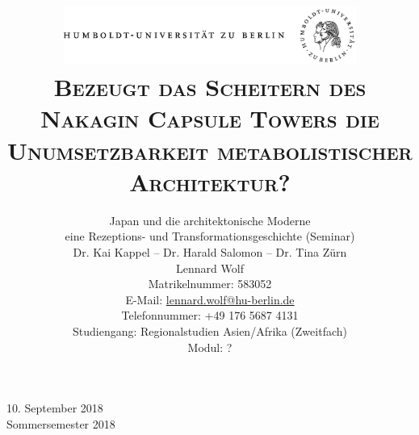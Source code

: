 \documentclass[a4paper, 12pt]{article}
\date{\vspace{-3ex}}
\begin{document}
\title{\vspace{5ex}
	\includegraphics*[bb=0 0 720 200, width=0.72\textwidth]{ErstesSem/images/hu_logo.png}\\
	\vspace{30pt}
	\scshape\LARGE{Bezeugt das Scheitern des Nakagin Capsule Towers die Unumsetzbarkeit metabolistischer Architektur?}\\\vspace{20pt}}
\author{Japan und die architektonische Moderne\\eine Rezeptions- und Transformationsgeschichte (Seminar)\\
	\vspace{7pt}
          Dr. Kai Kappel -- Dr. Harald Salomon -- Dr. Tina Zürn\\\vspace{4pt}Lennard Wolf\\
        \small{Matrikelnummer: 583052}\\
        \small{E-Mail: \href{mailto:lennard.wolf@hu-berlin.de}{lennard.wolf@hu-berlin.de}}\\
        \small{Telefonnummer: +49 176 5687 4131}\\
        \small{Studiengang: Regionalstudien Asien/Afrika (Zweitfach)}\\
        \small{Modul: ?}}

\maketitle

\vspace{\fill}

\begin{minipage}[]{0.92\textwidth}
    \centering
    \onehalfspacing
    \large   
    10. September 2018\\
    Sommersemester 2018

    \vspace{-20mm} 
\end{minipage}%
\thispagestyle{empty}
\newpage
\setcounter{page}{1}
\end{document}
